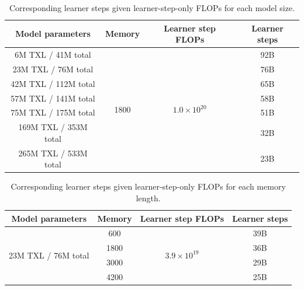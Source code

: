 \begin{table}[t!]
  \begin{center}
    \caption{Corresponding learner steps given learner-step-only FLOPs for each model size.}
    \begin{tabular}{c|c|c|c}
    \label{tab:parameter_scaling_learner_flops}
      Model parameters & Memory & Learner step FLOPs & Learner steps \\
      \hline
      6M TXL / 41M total & \multirow{7}{*}{1800} & \multirow{7}{*}{$1.0 \times 10^{20}$}& 92B\\
      23M TXL / 76M total & & & 76B\\
      42M TXL / 112M total & & & 65B\\
      57M TXL / 141M total & & & 58B\\
      75M TXL / 175M total & & & 51B\\
      169M TXL / 353M total & & & 32B\\
      265M TXL / 533M total & & & 23B\\
    \end{tabular}
  \end{center}
\end{table}

\begin{table}[t!]
  \begin{center}
    \caption{Corresponding learner steps given learner-step-only FLOPs for each memory length.}
    \begin{tabular}{c|c|c|c}
    \label{tab:memory_scaling_learner_flops}
      Model parameters & Memory & Learner step FLOPs & Learner steps \\
      \hline
      \multirow{4}{*}{23M TXL / 76M total} & 600 & \multirow{4}{*}{$3.9 \times 10^{19}$} & 39B\\
      & 1800 & & 36B\\
      & 3000 & & 29B\\
      & 4200 & & 25B\\
    \end{tabular}
  \end{center}
\end{table}

